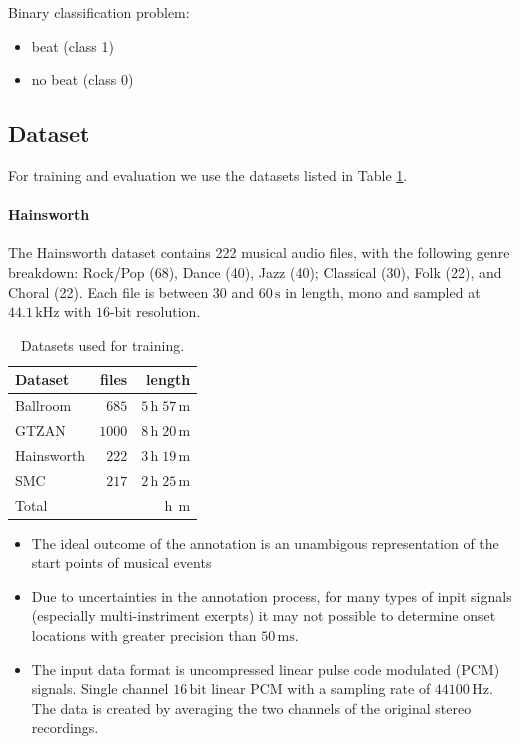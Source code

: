 \documentclass{scrartcl}
\begin{document}
Binary classification problem:
\begin{itemize}
\item beat (class 1)
\item no beat (class 0)
\end{itemize}



\subsection{Dataset}
For training and evaluation we use the datasets listed in Table \ref{tab:datasets}.

\paragraph{Hainsworth} The Hainsworth dataset \cite{Hainsworth2004} contains 222 musical audio files, with the following genre breakdown: Rock/Pop (68), Dance (40), Jazz (40); Classical (30), Folk (22), and Choral (22). Each file is between $30$ and $60\,\text{s}$ in length, mono and sampled at $44.1\,\text{kHz}$ with $16\text{-bit}$ resolution.
\begin{table}[htbp]
\caption{Datasets used for training.}
\label{tab:datasets}
\centering

\begin{tabular}{lrr}
\hline

\hline
\textbf{Dataset} & \textbf{files} & \textbf{length} \\
\hline
    Ballroom \cite{Gouyon2006b, Krebs2013} & $685$ & $5\,\text{h} \;57\,\text{m}$\\
    GTZAN \cite{Tzanetakis2002b, marchand2015swing} & $1000$ & $8\,\text{h}\;20\,\text{m}$\\
    Hainsworth \cite{Hainsworth2004} & $222$ & $3\,\text{h}\;19\,\text{m}$\\
    SMC \cite{Holzapfel2012} & $217$ & $2\,\text{h}\;25\,\text{m}$\\    
\hline
    Total & $ $ & $ \,\text{h}\; \,\text{m}$\\  
\hline

\hline
\end{tabular}
\end{table}  


\begin{itemize}
\item The ideal outcome of the annotation is an unambigous representation of the start points of musical events
\item Due to uncertainties in the annotation process, for many types of inpit signals (especially multi-instriment exerpts) it may not possible to determine onset locations with greater precision than $50\,\text{ms}$. \cite{Leveau2004}
\item The input data format is uncompressed linear pulse code modulated (PCM) signals. Single channel $16\,\text{bit}$ linear PCM with a sampling rate of $44100\,\text{Hz}$. The data is created by averaging the two channels of the original stereo recordings.
\end{itemize}
\end{document}
